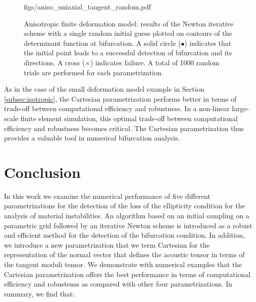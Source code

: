 \documentclass[12pt]{article}
\numberwithin{equation}{section}
\begin{document}
\begin{figure}[!htbp]
{   {figs/aniso_uniaxial_tangent_random.pdf}
 }
   \caption{Anisotropic finite deformation model: results of the
     Newton iterative scheme with a single random initial guess
     plotted on contours of the determinant function at
     bifurcation. A solid circle ($\bullet$) indicates that the
     initial point leads to a successful detection of bifurcation and
     its directions. A cross ($\times$) indicates failure. A total of
     1000 random trials are performed for each parametrization.}
   \label{fig:aniso-uniaxial-robust}
 \end{figure}

As in the case of the small deformation model example in Section
\ref{subsec:isotropic}, the Cartesian parametrization performs better
in terms of trade-off between computational efficiency and
robustness. In a non-linear large-scale finite element simulation,
this optimal trade-off between computational efficiency and robustness
becomes critical. The Cartesian parametrization thus provides a
valuable tool in numerical bifurcation analysis.

\section{Conclusion}

In this work we examine the numerical performance of five different
parametrizations for the detection of the loss of the ellipticity
condition for the analysis of material instabilities. An algorithm
based on an initial sampling on a parametric grid followed by an
iterative Newton scheme is introduced as a robust and efficient method
for the detection of the bifurcation condition. In addition, we
introduce a new parametrization that we term Cartesian for the
representation of the normal vector that defines the acoustic tensor
in terms of the tangent moduli tensor. We demonstrate with numerical
examples that the Cartesian parametrization offers the best
performance in terms of computational efficiency and robustenss as
compared with other four parametrizations. In summary, we find that:
\end{document}
